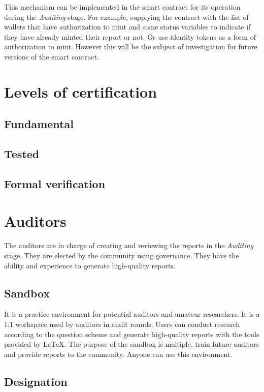 \documentclass[12pt]{article}
\begin{document}
This mechanism can be implemented in the smart contract for its operation during the \emph{Auditing} stage. For example, supplying the contract with the list of wallets that have authorization to mint and some status variables to indicate if they have already minted their report or not. Or use identity tokens as a form of authorization to mint. However this will be the subject of investigation for future versions of the smart contract.


\section{ Levels of certification }


\subsection { Fundamental }


\subsection { Tested }


\subsection { Formal verification }


\section{ Auditors }

The auditors are in charge of creating and reviewing the reports in the \emph{Auditing} stage. They are elected by the community using governance. They have the ability and experience to generate high-quality reports.

\subsection { Sandbox }

It is a practice environment for potential auditors and amateur researchers. It is a 1:1 workspace used by auditors in audit rounds. Users can conduct research according to the question scheme and generate high-quality reports with the tools provided by LaTeX. The purpose of the sandbox is multiple, train future auditors and provide reports to the community. Anyone can use this environment.


\subsection { Designation }
\end{document}
